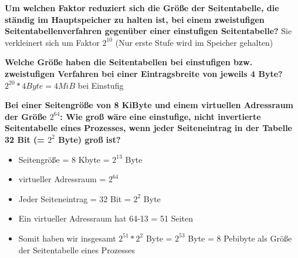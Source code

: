 \documentclass[a4paper]{article}
\begin{document}
\begin{description*}
\begin{itemize*}
        \item \textbf{Um welchen Faktor reduziert sich die Größe der Seitentabelle, die ständig im Hauptspeicher zu halten ist, bei einem zweistufigen Seitentabellenverfahren gegenüber einer einstufigen Seitentabelle?} Sie verkleinert sich um Faktor $2^{10}$ (Nur erste Stufe wird im Speicher gehalten)
        \item \textbf{Welche Größe haben die Seitentabellen bei einstufigen bzw. zweistufigen Verfahren bei einer Eintragsbreite von jeweils 4 Byte?} $2^{20} * 4 Byte = 4 MiB$ bei Einstufig
    \end{itemize*}
    \item \textbf{Bei einer Seitengröße von 8 KiByte und einem virtuellen Adressraum der Größe $2^{64}$: Wie groß wäre eine einstufige, nicht invertierte Seitentabelle eines Prozesses, wenn jeder Seiteneintrag in der Tabelle 32 Bit (= $2^2$ Byte) groß ist?}
    \begin{itemize}
        \item Seitengröße = 8 Kbyte = $2^{13}$ Byte
        \item virtueller Adressraum = $2^{64}$
        \item Jeder Seiteneintrag = 32 Bit = $2^2$ Byte
        \item Ein virtueller Adressraum hat 64-13 = 51 Seiten
        \item Somit haben wir insgesamt $2^{51} * 2^2$ Byte = $2^53$ Byte = 8 Pebibyte als Größe der Seitentabelle eines Prozesses
    \end{itemize}
\end{description*}

\end{document}
